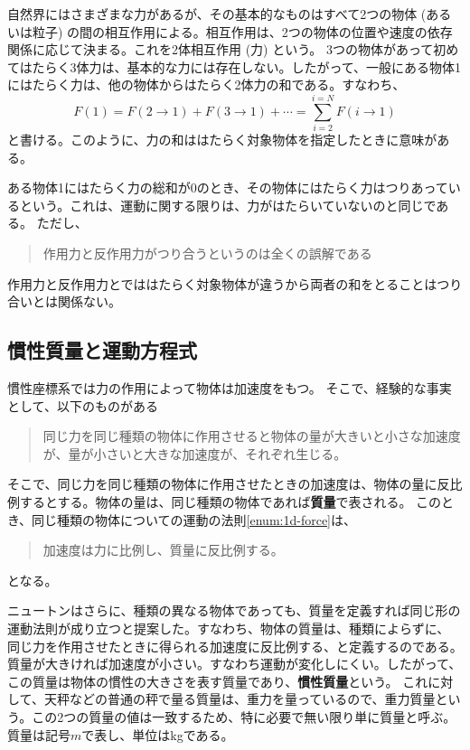\documentclass[a4paper, uplatex]{jsarticle}
\numberwithin{equation}{section}
\numberwithin{figure}{section}
\numberwithin{table}{section}
\begin{document}
自然界にはさまざまな力があるが、その基本的なものはすべて2つの物体 (あるいは粒子) の間の相互作用による。相互作用は、2つの物体の位置や速度の依存関係に応じて決まる。これを2体相互作用 (力) という。
3つの物体があって初めてはたらく3体力は、基本的な力には存在しない。したがって、一般にある物体1にはたらく力は、他の物体からはたらく2体力の和である。すなわち、
\begin{equation}
  F(1) = F(2 \to 1) + F(3 \to 1) + \cdots = \sum_{i = 2}^{i = N} F(i \to 1)
  \label{eq:1d-force-sum}
\end{equation}
と書ける。このように、力の和ははたらく対象物体を指定したときに意味がある。

ある物体1にはたらく力の総和が0のとき、その物体にはたらく力はつりあっているという。これは、運動に関する限りは、力がはたらいていないのと同じである。
ただし、
\begin{quote}
  作用力と反作用力がつり合うというのは全くの誤解である
\end{quote}

作用力と反作用力とでははたらく対象物体が違うから両者の和をとることはつり合いとは関係ない。

\subsection{慣性質量と運動方程式}
慣性座標系では力の作用によって物体は加速度をもつ。
そこで、経験的な事実として、以下のものがある
\begin{quote}
  同じ力を同じ種類の物体に作用させると物体の量が大きいと小さな加速度が、量が小さいと大きな加速度が、それぞれ生じる。
\end{quote}
そこで、同じ力を同じ種類の物体に作用させたときの加速度は、物体の量に反比例するとする。物体の量は、同じ種類の物体であれば\textbf{質量}で表される。
このとき、同じ種類の物体についての運動の法則\ref{enum:1d-force}は、
\begin{quote}
  加速度は力に比例し、質量に反比例する。
\end{quote}
となる。

ニュートンはさらに、種類の異なる物体であっても、質量を定義すれば同じ形の運動法則が成り立つと提案した。すなわち、物体の質量は、種類によらずに、
同じ力を作用させたときに得られる加速度に反比例する、と定義するのである。
質量が大きければ加速度が小さい。すなわち運動が変化しにくい。したがって、この質量は物体の慣性の大きさを表す質量であり、\textbf{慣性質量}という。
これに対して、天秤などの普通の秤で量る質量は、重力を量っているので、重力質量という。この2つの質量の値は一致するため、特に必要で無い限り単に質量と呼ぶ。
質量は記号\(m\)で表し、単位はkgである。
\end{document}
